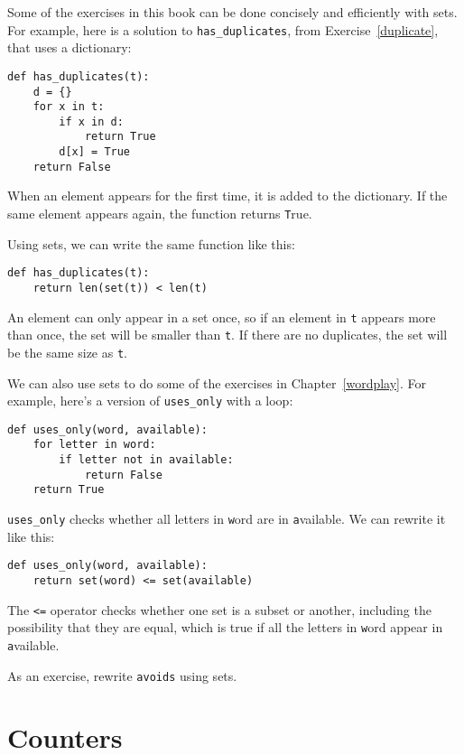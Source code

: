 \documentclass[
DIV=11,
fontsize=12,
twoside,
headinclude=false,
titlepage=firstiscover,
abstract=true,
headsepline=true,
footsepline=true,
chapterprefix=true, %
headings=big,
bibliography=totoc,%
captions=tableheading
]{scrbook}
\theoremstyle{definition}
\begin{document}
Some of the exercises in this book can be done concisely and
efficiently with sets.  For example, here is a solution to
\verb"has_duplicates", from
Exercise~\ref{duplicate}, that uses a dictionary:

\begin{lstlisting}
def has_duplicates(t):
    d = {}
    for x in t:
        if x in d:
            return True
        d[x] = True
    return False
\end{lstlisting}

When an element appears for the first time, it is added to the
dictionary.  If the same element appears again, the function returns
{\texttt True}.

Using sets, we can write the same function like this:

\begin{lstlisting}
def has_duplicates(t):
    return len(set(t)) < len(t)
\end{lstlisting}
%
An element can only appear in a set once, so if an element in {\texttt t}
appears more than once, the set will be smaller than {\texttt t}.  If there
are no duplicates, the set will be the same size as {\texttt t}.

We can also use sets to do some of the exercises in
Chapter~\ref{wordplay}.  For example, here's a version of
\verb"uses_only" with a loop:

\begin{lstlisting}
def uses_only(word, available):
    for letter in word: 
        if letter not in available:
            return False
    return True
\end{lstlisting}
%
\verb"uses_only" checks whether all letters in {\texttt word} are
in {\texttt available}.  We can rewrite it like this:

\begin{lstlisting}
def uses_only(word, available):
    return set(word) <= set(available)
\end{lstlisting}
%
The \verb"<=" operator checks whether one set is a subset or another,
including the possibility that they are equal, which is true if all
the letters in {\texttt word} appear in {\texttt available}.

As an exercise, rewrite \verb"avoids" using sets.


\section{Counters}
\end{document}
